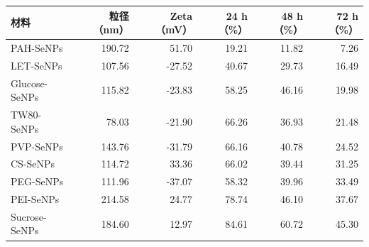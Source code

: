 \begin{tabular}{lrrrrr}
\toprule
材料 & 粒径（nm） & Zeta（mV） & 24 h（\%） & 48 h（\%） & 72 h（\%） \\
\midrule
PAH-SeNPs & 190.72 & 51.70 & 19.21 & 11.82 & 7.26 \\
LET-SeNPs & 107.56 & -27.52 & 40.67 & 29.73 & 16.49 \\
Glucose-SeNPs & 115.82 & -23.83 & 58.25 & 46.16 & 19.98 \\
TW80-SeNPs & 78.03 & -21.90 & 66.26 & 36.93 & 21.48 \\
PVP-SeNPs & 143.76 & -31.79 & 66.16 & 40.78 & 24.52 \\
CS-SeNPs & 114.72 & 33.36 & 66.02 & 39.44 & 31.25 \\
PEG-SeNPs & 111.96 & -37.07 & 58.32 & 39.96 & 33.49 \\
PEI-SeNPs & 214.58 & 24.77 & 78.74 & 46.10 & 37.67 \\
Sucrose-SeNPs & 184.60 & 12.97 & 84.61 & 60.72 & 45.30 \\
\bottomrule
\end{tabular}
